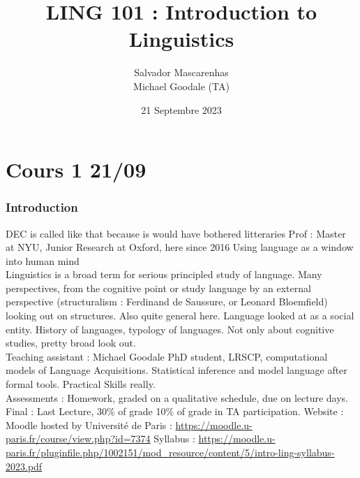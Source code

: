 \documentclass{cours}
\title{LING 101 : Introduction to Linguistics}
\author{Salvador Mascarenhas \\ \small Michael Goodale (TA)}
\date{21 Septembre 2023}
\begin{document}
\part[Language : Psychological and Social Entity]{Cours 1 21/09}
\section*{Introduction}
    DEC is called like that because is would have bothered litteraries
    Prof : Master at NYU, Junior Research at Oxford, here since 2016
    Using language as a window into human mind\\
    Linguistics is a broad term for serious principled study of language. 
    Many perspectives, from the cognitive point or study language by an external perspective (structuralism : Ferdinand de Saussure, or Leonard Bloemfield) looking out on structures.
    Also quite general here.
    Language looked at as a social entity.
    History of languages, typology of languages.
    Not only about cognitive studies, pretty broad look out.\\
    Teaching assistant : Michael Goodale PhD student, LRSCP, computational models of Language Acquisitions. Statistical inference and model language after formal tools.
    Practical Skills really.\\
    Assessments : Homework, graded on a qualitative schedule, due on lecture days.
    Final : Last Lecture, 30\% of grade
    10\% of grade in TA participation. 
    Website : Moodle hosted by Université de Paris : \url{https://moodle.u-paris.fr/course/view.php?id=7374}
    Syllabus : \url{https://moodle.u-paris.fr/pluginfile.php/1002151/mod_resource/content/5/intro-ling-syllabus-2023.pdf}
\end{document}
